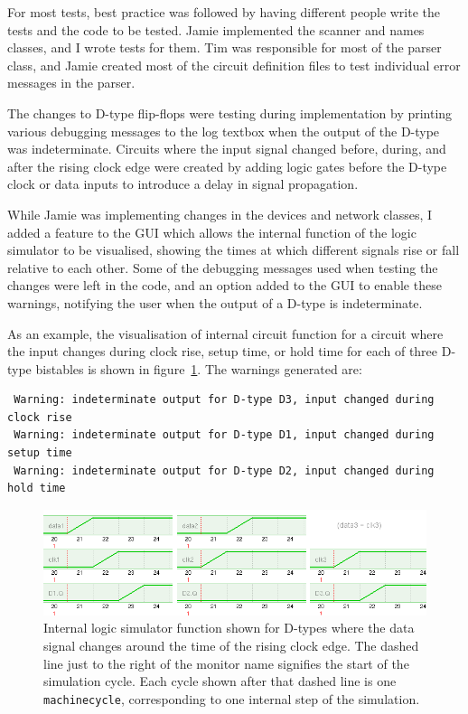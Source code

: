 \documentclass[a4paper,10pt]{article}
\begin{document}
For most tests, best practice was followed by having different people write the tests and the code to be tested. Jamie implemented the scanner and names classes, and I wrote tests for them. Tim was responsible for most of the parser class, and Jamie created most of the circuit definition files to test individual error messages in the parser.  

The changes to D-type flip-flops were testing during implementation by printing various debugging messages to the log textbox when the output of the D-type was indeterminate. Circuits where the input signal changed before, during, and after the rising clock edge were created by adding logic gates before the D-type clock or data inputs to introduce a delay in signal propagation.

While Jamie was implementing changes in the devices and network classes, I added a feature to the GUI which allows the internal function of the logic simulator to be visualised, showing the times at which different signals rise or fall relative to each other. Some of the debugging messages used when testing the changes were left in the code, and an option added to the GUI to enable these warnings, notifying the user when the output of a D-type is indeterminate. 

As an example, the visualisation of internal circuit function for a circuit where the input changes during clock rise, setup time, or hold time for each of three D-type bistables is shown in figure~\ref{fig:dtype-each}. The warnings generated are:

\begin{verbatim}
 Warning: indeterminate output for D-type D3, input changed during clock rise
 Warning: indeterminate output for D-type D1, input changed during setup time
 Warning: indeterminate output for D-type D2, input changed during hold time
\end{verbatim}

\begin{figure}[h]
 \centering
 \includegraphics[width=16cm]{dtype-test2.png}
 \caption{Internal logic simulator function shown for D-types where the data signal changes around the time of the rising clock edge. The dashed line just to the right of the monitor name signifies the start of the simulation cycle. Each cycle shown after that dashed line is one \texttt{machinecycle}, corresponding to one internal step of the simulation.}
 \label{fig:dtype-each}
\end{figure}
\end{document}
